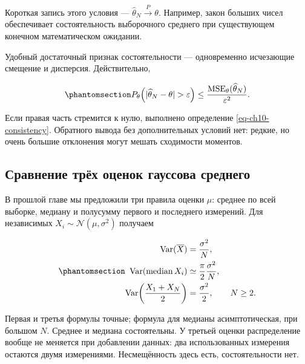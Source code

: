 \documentclass[
  russian,
  11pt,
  a4paper,
  open=any]{scrbook}
\begin{document}
Короткая запись этого условия ---
\(\widehat\theta_N\xrightarrow{P}\theta\). Например, закон больших чисел
обеспечивает состоятельность выборочного среднего при существующем
конечном математическом ожидании.

Удобный достаточный признак состоятельности --- одновременно исчезающие
смещение и дисперсия. Действительно,

\begin{equation}\protect\phantomsection\label{eq-ch10-consistency-mse-bound}{
P_\theta\!\left(|\widehat\theta_N-\theta|>\varepsilon\right)
\leq
\frac{\operatorname{MSE}_\theta(\widehat\theta_N)}{\varepsilon^2}.
}\end{equation}

Если правая часть стремится к нулю, выполнено определение
\ref{eq-ch10-consistency}. Обратного вывода без дополнительных условий
нет: редкие, но очень большие отклонения могут мешать сходимости
моментов.

\subsection{Сравнение трёх оценок гауссова
среднего}\label{ux441ux440ux430ux432ux43dux435ux43dux438ux435-ux442ux440ux451ux445-ux43eux446ux435ux43dux43eux43a-ux433ux430ux443ux441ux441ux43eux432ux430-ux441ux440ux435ux434ux43dux435ux433ux43e}

В прошлой главе мы предложили три правила оценки \(\mu\): среднее по
всей выборке, медиану и полусумму первого и последнего измерений. Для
независимых \(X_i\sim\mathcal N(\mu,\sigma^2)\) получаем

\begin{equation}\protect\phantomsection\label{eq-ch10-three-estimator-variances}{
\begin{aligned}
\operatorname{Var}(\overline X)&=\frac{\sigma^2}{N},\\
\operatorname{Var}(\operatorname{median}X_i)
&\simeq\frac{\pi}{2}\frac{\sigma^2}{N},\\
\operatorname{Var}\!\left(\frac{X_1+X_N}{2}\right)
&=\frac{\sigma^2}{2},\qquad N\geq2.
\end{aligned}
}\end{equation}

Первая и третья формулы точные; формула для медианы асимптотическая, при
большом \(N\). Среднее и медиана состоятельны. У третьей оценки
распределение вообще не меняется при добавлении данных: два
использованных измерения остаются двумя измерениями. Несмещённость здесь
есть, состоятельности нет.
\end{document}
